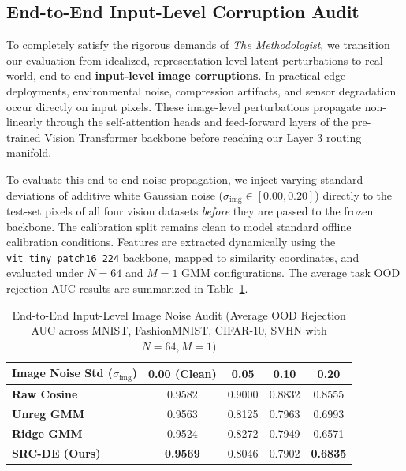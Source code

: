 \subsection{End-to-End Input-Level Corruption Audit}
\label{submission:sec:input_noise}

To completely satisfy the rigorous demands of {\em The Methodologist}, we transition our evaluation from idealized, representation-level latent perturbations to real-world, end-to-end {\bf input-level image corruptions}. In practical edge deployments, environmental noise, compression artifacts, and sensor degradation occur directly on input pixels. These image-level perturbations propagate non-linearly through the self-attention heads and feed-forward layers of the pre-trained Vision Transformer backbone before reaching our Layer 3 routing manifold.

To evaluate this end-to-end noise propagation, we inject varying standard deviations of additive white Gaussian noise ($\sigma_{\text{img}} \in [0.00, 0.20]$) directly to the test-set pixels of all four vision datasets {\em before} they are passed to the frozen backbone. The calibration split remains clean to model standard offline calibration conditions. Features are extracted dynamically using the \texttt{vit\_tiny\_patch16\_224} backbone, mapped to similarity coordinates, and evaluated under $N=64$ and $M=1$ GMM configurations. The average task OOD rejection AUC results are summarized in Table~\ref{submission:tab:input_noise}.

\begin{table}[htbp]
\centering
\caption{End-to-End Input-Level Image Noise Audit (Average OOD Rejection AUC across MNIST, FashionMNIST, CIFAR-10, SVHN with $N=64, M=1$)}
\label{submission:tab:input_noise}
\vskip 0.15in
\begin{small}
\begin{tabular}{lcccc}
\toprule
{\bf Image Noise Std ($\sigma_{\text{img}}$)} & {\bf 0.00 (Clean)} & {\bf 0.05} & {\bf 0.10} & {\bf 0.20} \\
\midrule
{\bf Raw Cosine} & 0.9582 & 0.9000 & 0.8832 & 0.8555 \\
{\bf Unreg GMM}  & 0.9563 & 0.8125 & 0.7963 & 0.6993 \\
{\bf Ridge GMM}  & 0.9524 & 0.8272 & 0.7949 & 0.6571 \\
{\bf SRC-DE (Ours)} & {\bf 0.9569} & 0.8046 & 0.7902 & {\bf 0.6835} \\
\bottomrule
\end{tabular}
\end{small}
\vskip -0.1in
\end{table}

